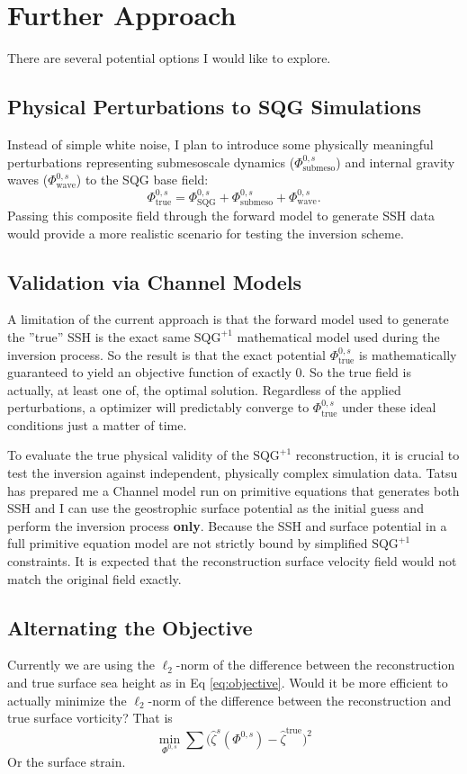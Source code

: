 \documentclass[11pt]{article}
\newcommand{\<}{\langle}
\renewcommand{\>}{\rangle}
\begin{document}
    \section{Further Approach}
    There are several potential options I would like to explore.
    \subsection{Physical Perturbations to SQG Simulations}
    Instead of simple white noise, I plan to introduce some physically meaningful perturbations representing submesoscale dynamics ($\Phi^{0,s}_{\text{submeso}}$) and internal gravity waves ($\Phi^{0,s}_{\text{wave}}$) to the SQG base field:
    \[
        \Phi^{0,s}_{\text{true}} = \Phi^{0,s}_{\text{SQG}} + \Phi^{0,s}_{\text{submeso}} + \Phi^{0,s}_{\text{wave}}.
    \]
    Passing this composite field through the forward model to generate SSH data would provide a more realistic scenario for testing the inversion scheme.

    \subsection{Validation via Channel Models}
    A limitation of the current approach is that the forward model used to generate the ''true'' SSH is the exact same $\text{SQG}^{+1}$ mathematical model used during the inversion process. So the result is that the exact potential $\Phi^{0,s}_{\text{true}}$ is mathematically guaranteed to yield an objective function of exactly 0. So the true field is actually, at least one of, the optimal solution. Regardless of the applied perturbations, a optimizer will predictably converge to $\Phi^{0,s}_{\text{true}}$ under these ideal conditions just a matter of time.

    To evaluate the true physical validity of the $\text{SQG}^{+1}$ reconstruction, it is crucial to test the inversion against independent, physically complex simulation data. Tatsu has prepared me a Channel model run on primitive equations that generates both SSH and I can use the geostrophic surface potential as the initial guess and perform the inversion process \textbf{only}. Because the SSH and surface potential in a full primitive equation model are not strictly bound by simplified $\text{SQG}^{+1}$ constraints. It is expected that the reconstruction surface velocity field would not match the original field exactly.

    \subsection{Alternating the Objective}
    Currently we are using the $\ell_2$-norm of the difference between the reconstruction and true surface sea height as in Eq \ref{eq:objective}. Would it be more efficient to actually minimize the $\ell_2$-norm of the difference between the reconstruction and true surface vorticity? That is 
    \begin{equation}
    \min_{\Phi^{0,s}} \sum \Big( \hat{\zeta}^{s}(\Phi^{0,s}) - \hat{\zeta}^{\text{true}} \Big)^2
    \end{equation} 
    Or the surface strain.
\end{document}
